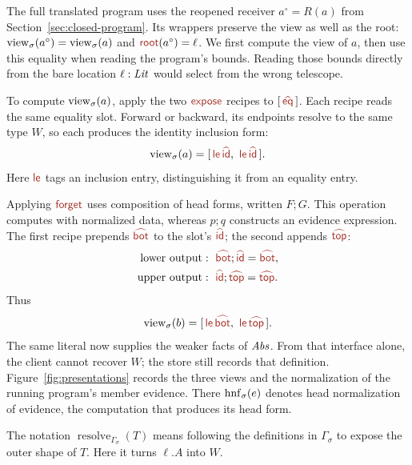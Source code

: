 The full translated program uses the reopened receiver
$a^\circ=R(a)$ from Section~\ref{sec:closed-program}. Its wrappers
preserve the view as well as the root:
$\operatorname{view}_{\sigma}(a^\circ)=\operatorname{view}_{\sigma}(a)$ and $\ev{root}(a^\circ)=\ell$.
We first compute the view of $a$, then use this equality when reading the
program's bounds. Reading those bounds directly from the bare location
$\ell:\mathit{Lit}$ would select from the wrong telescope.

To compute $\operatorname{view}_{\sigma}(a)$, apply the two $\ev{expose}$ recipes to
$[\,\form{eq}\,]$. Each recipe reads the same equality slot. Forward or
backward, its endpoints resolve to the same type $W$, so each produces
the identity inclusion form:
\[
 \view{a}=[\,\ev{le}\,\form{id},\ \ev{le}\,\form{id}\,].
\]
Here $\ev{le}$ tags an inclusion entry, distinguishing it from an
equality entry.

Applying $\ev{forget}$ uses composition of head forms, written $F;G$.
This operation computes with normalized data, whereas $p;q$ constructs
an evidence expression. The first recipe prepends $\form{bot}$ to the
slot's $\form{id}$; the second appends $\form{top}$:
\[
 \begin{aligned}
 \text{lower output}&:\ \form{bot};\form{id}=\form{bot},\\
 \text{upper output}&:\ \form{id};\form{top}=\form{top}.
 \end{aligned}
\]
Thus
\[
 \view{b}=[\,\ev{le}\,\form{bot},\ \ev{le}\,\form{top}\,].
\]
The same literal now supplies the weaker facts of $\mathit{Abs}$.
From that interface alone, the client cannot recover $W$;
the store still records that definition. Figure~\ref{fig:presentations}
records the three views and the normalization of the running program's
member evidence. There $\operatorname{hnf}_{\sigma}(e)$ denotes head normalization of evidence,
the computation that produces its head form.

The notation $\operatorname{resolve}_{\Gamma_\sigma}(T)$ means following
the definitions in $\Gamma_\sigma$ to expose the outer shape of $T$.
Here it turns $\ell.A$ into $W$.








